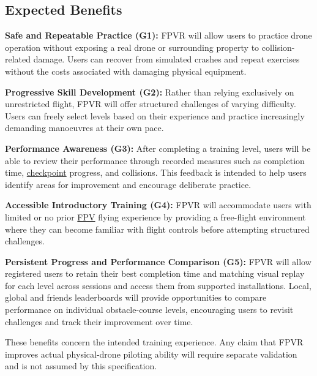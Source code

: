 \documentclass[12pt]{article}
\begin{document}
\subsection{Expected Benefits}\label{g3}

\textbf{Safe and Repeatable Practice (G1):}
FPVR will allow users to practice drone operation without exposing
a real drone or surrounding property to collision-related damage.
Users can recover from simulated crashes and repeat exercises
without the costs associated with damaging physical equipment.

\medskip

\textbf{Progressive Skill Development (G2):}
Rather than relying exclusively on unrestricted flight, FPVR
will offer structured challenges of varying difficulty.
Users can freely select levels based on their experience and
practice increasingly demanding manoeuvres at their own pace.

\medskip

\textbf{Performance Awareness (G3):}
After completing a training level, users will be able to
review their performance through recorded measures such as
completion time, \hyperlink{glos:Checkpoint}{checkpoint} progress, and collisions.
This feedback is intended to help users identify areas for
improvement and encourage deliberate practice.

\medskip

\textbf{Accessible Introductory Training (G4):}
FPVR will accommodate users with limited or no prior \hyperlink{glos:FPV}{FPV}
flying experience by providing a free-flight environment
where they can become familiar with flight controls before
attempting structured challenges.

\medskip

\hypertarget{goal:G5}{}\textbf{Persistent Progress and
Performance Comparison (G5):}
FPVR will allow registered users to retain
their best completion time and matching visual replay for each level across
sessions and access them from supported installations.
Local, global and friends leaderboards will provide
opportunities to compare performance on
individual obstacle-course levels, encouraging
users to revisit challenges and track their
improvement over time.

\medskip

These benefits concern the intended training experience.
Any claim that FPVR improves actual physical-drone piloting
ability will require separate validation and is not assumed
by this specification.
\end{document}
